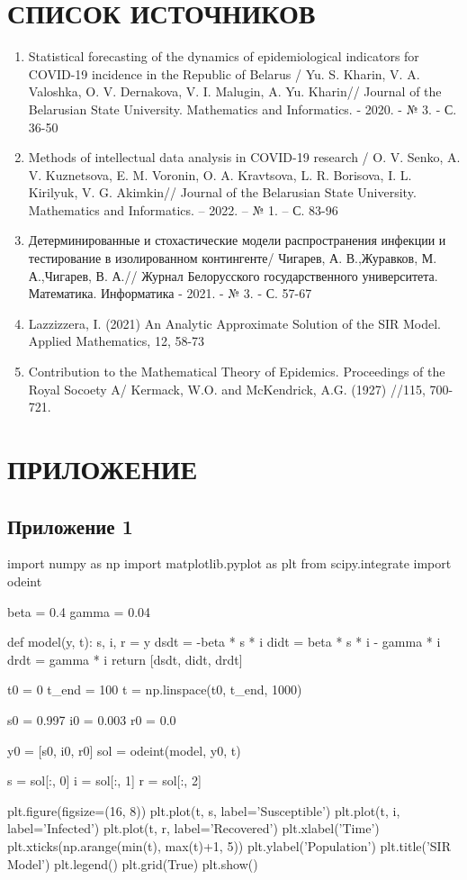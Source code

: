 \documentclass[a4paper, 12pt]{extarticle}
\numberwithin{equation}{section}
\begin{document}
	\section*{СПИСОК ИСТОЧНИКОВ}
	\begin{enumerate}
		\item Statistical forecasting of the dynamics of epidemiological indicators for COVID-19 incidence in the Republic of Belarus / Yu. S. Kharin, V. A. Valoshka, O. V. Dernakova, V. I. Malugin, A. Yu. Kharin// Journal of the Belarusian State University. Mathematics and Informatics. - 2020. - № 3. - С. 36-50
		\item Methods of intellectual data analysis in COVID-19 research / O. V. Senko, A. V. Kuznetsova, E. M. Voronin, O. A. Kravtsova, L. R. Borisova, I. L. Kirilyuk, V. G. Akimkin// Journal of the Belarusian State University. Mathematics and Informatics. – 2022. – № 1. – С. 83-96
		\item Детерминированные и стохастические модели распространения инфекции и тестирование в изолированном контингенте/ Чигарев, А. В.,Журавков, М. А.,Чигарев, В. А.// Журнал Белорусского государственного университета. Математика. Информатика - 2021. - № 3. - С. 57-67
		\item Lazzizzera, I. (2021) An Analytic Approximate Solution of the SIR Model. Applied Mathematics, 12, 58-73
		\item Contribution to the Mathematical Theory of Epidemics. Proceedings of the Royal Socoety A/ Kermack, W.O. and McKendrick, A.G. (1927) //115, 700-721.
	\end{enumerate}
	\newpage
	\section*{ПРИЛОЖЕНИЕ}
	\subsection*{Приложение 1}
	\begin{python}
		import numpy as np
		import matplotlib.pyplot as plt
		from scipy.integrate import odeint
		
		beta = 0.4
		gamma = 0.04
		
		def model(y, t):
		s, i, r = y
		dsdt = -beta * s * i
		didt = beta * s * i - gamma * i
		drdt = gamma * i
		return [dsdt, didt, drdt]
		
		t0 = 0
		t_end = 100
		t = np.linspace(t0, t_end, 1000) 
		
		s0 = 0.997
		i0 = 0.003
		r0 = 0.0
		
		y0 = [s0, i0, r0]
		sol = odeint(model, y0, t)
		
		s = sol[:, 0]
		i = sol[:, 1]
		r = sol[:, 2]
		
		plt.figure(figsize=(16, 8))
		plt.plot(t, s, label='Susceptible')
		plt.plot(t, i, label='Infected')
		plt.plot(t, r, label='Recovered')
		plt.xlabel('Time')
		plt.xticks(np.arange(min(t), max(t)+1, 5))
		plt.ylabel('Population')
		plt.title('SIR Model')
		plt.legend()
		plt.grid(True)
		plt.show()
	\end{python}
	
\end{document}

